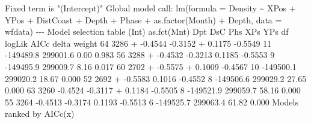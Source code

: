 \documentclass[
  oneside]{krantz}
\newenvironment{Shaded}{\begin{snugshade}}{\end{snugshade}}
\newcommand{\AttributeTok}[1]{\textcolor[rgb]{0.77,0.63,0.00}{#1}}
\newcommand{\DecValTok}[1]{\textcolor[rgb]{0.00,0.00,0.81}{#1}}
\newcommand{\FloatTok}[1]{\textcolor[rgb]{0.00,0.00,0.81}{#1}}
\newcommand{\FunctionTok}[1]{\textcolor[rgb]{0.00,0.00,0.00}{#1}}
\newcommand{\NormalTok}[1]{#1}
\newcommand{\SpecialCharTok}[1]{\textcolor[rgb]{0.00,0.00,0.00}{#1}}
\newcommand{\StringTok}[1]{\textcolor[rgb]{0.31,0.60,0.02}{#1}}
\begin{document}
\tiny

\begin{Shaded}
\begin{Highlighting}[]
\NormalTok{Fixed term is }\StringTok{"(Intercept)"}
\NormalTok{Global model call}\SpecialCharTok{:} \FunctionTok{lm}\NormalTok{(}\AttributeTok{formula =}\NormalTok{ Density }\SpecialCharTok{\textasciitilde{}}\NormalTok{ XPos }\SpecialCharTok{+}\NormalTok{ YPos }\SpecialCharTok{+}\NormalTok{ DistCoast }\SpecialCharTok{+}\NormalTok{ Depth }\SpecialCharTok{+}\NormalTok{ Phase }\SpecialCharTok{+} 
    \FunctionTok{as.factor}\NormalTok{(Month) }\SpecialCharTok{+}\NormalTok{ Depth, }\AttributeTok{data =}\NormalTok{ wfdata)}
\SpecialCharTok{{-}{-}{-}}
\NormalTok{Model selection table }
\NormalTok{   (Int) }\FunctionTok{as.fct}\NormalTok{(Mnt)     Dpt     DsC Phs    XPs     YPs df    logLik     AICc delta weight}
\DecValTok{64}  \DecValTok{3286}           \SpecialCharTok{+} \SpecialCharTok{{-}}\FloatTok{0.4544} \SpecialCharTok{{-}}\FloatTok{0.3152}   \SpecialCharTok{+} \FloatTok{0.1175} \SpecialCharTok{{-}}\FloatTok{0.5549} \DecValTok{11} \SpecialCharTok{{-}}\FloatTok{149489.8} \FloatTok{299001.6}  \FloatTok{0.00}  \FloatTok{0.983}
\DecValTok{56}  \DecValTok{3288}           \SpecialCharTok{+} \SpecialCharTok{{-}}\FloatTok{0.4532} \SpecialCharTok{{-}}\FloatTok{0.3213}     \FloatTok{0.1185} \SpecialCharTok{{-}}\FloatTok{0.5553}  \DecValTok{9} \SpecialCharTok{{-}}\FloatTok{149495.9} \FloatTok{299009.7}  \FloatTok{8.16}  \FloatTok{0.017}
\DecValTok{60}  \DecValTok{2702}           \SpecialCharTok{+} \SpecialCharTok{{-}}\FloatTok{0.5575}           \SpecialCharTok{+} \FloatTok{0.1009} \SpecialCharTok{{-}}\FloatTok{0.4567} \DecValTok{10} \SpecialCharTok{{-}}\FloatTok{149500.1} \FloatTok{299020.2} \FloatTok{18.67}  \FloatTok{0.000}
\DecValTok{52}  \DecValTok{2692}           \SpecialCharTok{+} \SpecialCharTok{{-}}\FloatTok{0.5583}             \FloatTok{0.1016} \SpecialCharTok{{-}}\FloatTok{0.4552}  \DecValTok{8} \SpecialCharTok{{-}}\FloatTok{149506.6} \FloatTok{299029.2} \FloatTok{27.65}  \FloatTok{0.000}
\DecValTok{63}  \DecValTok{3260}             \SpecialCharTok{{-}}\FloatTok{0.4524} \SpecialCharTok{{-}}\FloatTok{0.3117}   \SpecialCharTok{+} \FloatTok{0.1184} \SpecialCharTok{{-}}\FloatTok{0.5505}  \DecValTok{8} \SpecialCharTok{{-}}\FloatTok{149521.9} \FloatTok{299059.7} \FloatTok{58.16}  \FloatTok{0.000}
\DecValTok{55}  \DecValTok{3264}             \SpecialCharTok{{-}}\FloatTok{0.4513} \SpecialCharTok{{-}}\FloatTok{0.3174}     \FloatTok{0.1193} \SpecialCharTok{{-}}\FloatTok{0.5513}  \DecValTok{6} \SpecialCharTok{{-}}\FloatTok{149525.7} \FloatTok{299063.4} \FloatTok{61.82}  \FloatTok{0.000}
\NormalTok{Models ranked by }\FunctionTok{AICc}\NormalTok{(x)}
\end{Highlighting}
\end{Shaded}
\end{document}
